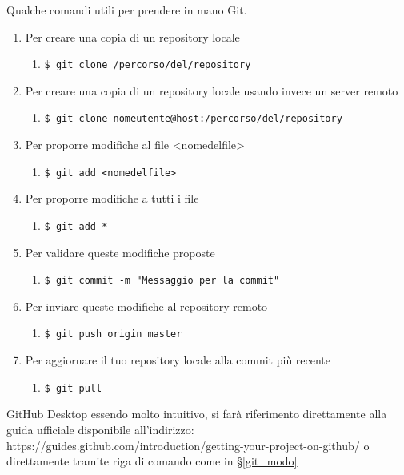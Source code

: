 \documentclass[a4paper,11pt]{article}
\begin{document}
		 \label{git_modo} 
		Qualche comandi utili per prendere in mano Git\addglos .
		\begin{enumerate}			
			\item Per creare una copia di un repository locale
			\begin{enumerate} \item[] \texttt{\$ git clone /percorso/del/repository}\end{enumerate}
			\item Per creare una copia di un repository locale usando invece un server remoto 
			\begin{enumerate} \item[] \texttt{\$ git clone nomeutente@host:/percorso/del/repository} \end{enumerate}
			\item Per proporre modifiche al file <nomedelfile>		
			\begin{enumerate} \item[] \texttt{\$ git add <nomedelfile> } \end{enumerate}
			\item Per proporre modifiche a tutti i file
			\begin{enumerate} \item[] \texttt{\$ git add * }\end{enumerate}
			\item Per validare queste modifiche proposte 
			\begin{enumerate} \item[] \texttt{\$ git commit -m "Messaggio per la commit"}  \end{enumerate}
			\item Per inviare queste modifiche al repository remoto
			\begin{enumerate} \item[] \texttt{\$ git push origin master }\end{enumerate}
			\item Per aggiornare il tuo repository locale alla commit più recente	
			\begin{enumerate} \item[] \texttt{\$ git pull } \end{enumerate}
		\end{enumerate}
			GitHub Desktop essendo molto intuitivo, si farà riferimento direttamente alla guida ufficiale disponibile all'indirizzo: https://guides.github.com/introduction/getting-your-project-on-github/  o direttamente tramite riga di comando come in §\ref{git_modo} 
\end{document}

